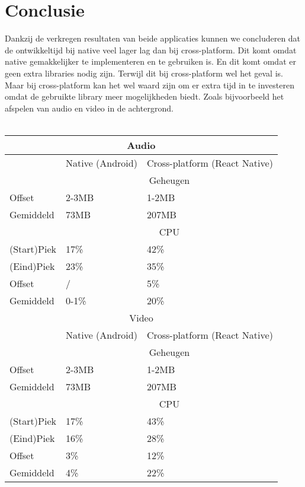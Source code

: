 \section{Conclusie}
Dankzij de verkregen resultaten van beide applicaties kunnen we concluderen dat de ontwikkeltijd bij 
native veel lager lag dan bij cross-platform. Dit komt omdat native gemakkelijker te implementeren en te gebruiken is.
En dit komt omdat er geen extra libraries nodig zijn. Terwijl dit bij cross-platform wel het geval is.
Maar bij cross-platform kan het wel waard zijn om er extra tijd in te investeren omdat de gebruikte library 
meer mogelijkheden biedt. Zoals bijvoorbeeld het afspelen van audio en video in de achtergrond.
\\\\
\begin{tabular}{ |p{3cm}||p{5cm}|p{5cm}| }
    \hline
    \multicolumn{3}{|c|}{Audio} \\ 
    \hline
     & Native (Android) & Cross-platform (React Native) \\
    \hline
     & \multicolumn{2}{|c|}{Geheugen} \\ 
    \hline
    Offset & 2-3MB & 1-2MB \\
    Gemiddeld & 73MB & 207MB \\
    \hline
     & \multicolumn{2}{|c|}{CPU} \\
    \hline
    (Start)Piek & 17\% & 42\% \\
    (Eind)Piek & 23\% & 35\% \\
    Offset & / & 5\% \\
    Gemiddeld & 0-1\% & 20\% \\
    \hline
    \multicolumn{3}{|c|}{Video} \\ 
    \hline
     & Native (Android) & Cross-platform (React Native) \\
    \hline
     & \multicolumn{2}{|c|}{Geheugen} \\ 
    \hline
    Offset & 2-3MB & 1-2MB \\
    Gemiddeld & 73MB & 207MB \\
    \hline
     & \multicolumn{2}{|c|}{CPU} \\
    \hline
    (Start)Piek & 17\% & 43\% \\
    (Eind)Piek & 16\% & 28\% \\
    Offset & 3\% & 12\% \\
    Gemiddeld & 4\% & 22\% \\
    \hline
\end{tabular}
\\\\
